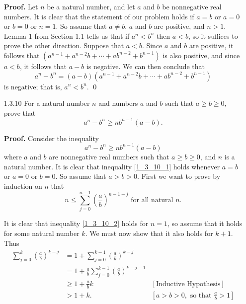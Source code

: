 \begin{enumerate}
      \textbf{Proof.} Let $n$ be a natural number, and let $a$ and $b$ be 
      nonnegative real numbers. It is clear that the statement of our problem
      holds if $a = b$ or $a = 0$ or $b = 0$ or $n = 1$. So assume that
      $a \neq b$, $a$ and $b$ are positive, and $n > 1$. Lemma 1 from Section
      1.1 tells us that if $a^n < b^n$ then $a < b$, so it suffices to prove the 
      other direction. Suppose that $a < b$. Since $a$ and $b$ are positive, it
      follows that $(a^{n-1} + a^{n-2}b + \cdots + ab^{n-2} + b^{n-1})$ is also
      positive, and since $a < b$, it follows that $a - b$ is negative. We can
      then conclude that
      $$a^n - b^n = (a - b)(a^{n-1} + a^{n-2}b + \cdots + ab^{n-2} + b^{n-1})$$
      is negative; that is, $a^n < b^n$. \qed
   \item[1.3.10]  For a natural number $n$ and numbers $a$ and $b$ such that
                  $a \ge b \ge 0$, prove that
                  $$a^n - b^n \ge nb^{n - 1}(a - b).$$

      \textbf{Proof.} Consider the inequality
      \begin{equation}
         a^n - b^n \ge nb^{n - 1}(a - b) \label{1_3_10_1}
      \end{equation}
      where $a$ and $b$ are nonnegative real numbers such that $a \ge b \ge 0$, 
      and $n$ is a natural number. It is clear that inequality \eqref{1_3_10_1}
      holds whenever $a = b$ or $a = 0$ or $b = 0$. So assume that $a > b > 0$.
      First we want to prove by induction on $n$ that
      \begin{equation}
         n \le \sum_{j = 0}^{n - 1} \left(\frac{a}{b}\right)^{n - 1 - j}
         \text{ for all natural } n. \label{1_3_10_2}
      \end{equation}

      It is clear that inequality \eqref{1_3_10_2} holds for $n = 1$, so assume
      that it holds for some natural number $k$. We must now show that it also
      holds for $k + 1$. Thus
      \begin{align*}
         \sum_{j = 0}^{k} \left(\frac{a}{b}\right)^{k - j}
            &= 1 + \sum_{j = 0}^{k - 1} \left(\frac{a}{b}\right)^{k - j} \\
            &= 1 + \frac{a}{b}\sum_{j = 0}^{k - 1}
               \left(\frac{a}{b}\right)^{k - j - 1} \\
            &\ge 1 + \frac{a}{b}k &[\text{Inductive Hypothesis}] \\
            &> 1 + k. &\left[a > b > 0, \text{ so that }
                                   \frac{a}{b} > 1\right]
      \end{align*}


\end{enumerate}
